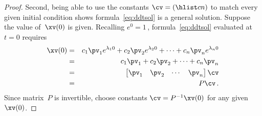 \begin{proof}
\begin{comment}
Straightforward substitution is simpler, but the above reinforces the simplification through diagonalisation.
\end{comment}

Second, being able to use the constants \(\cv=(\hlist cn)\) to match every given initial condition shows formula~\eqref{eq:ddtsol} is a general solution.
Suppose the value of~\(\xv(0)\) is given.
Recalling \(e^0=1\)\,, formula~\eqref{eq:ddtsol} evaluated at \(t=0\)  requires
\begin{eqnarray*}
\xv(0)&=&c_1\pv_1e^{\lambda_10}+c_2\pv_2e^{\lambda_20}+\cdots+c_n\pv_ne^{\lambda_n0}
\\&=&c_1\pv_1+c_2\pv_2+\cdots+c_n\pv_n
\\&=&\begin{bmatrix} \pv_1&\pv_2&\cdots&\pv_n \end{bmatrix}\cv
\\&=&P\cv\,.
\end{eqnarray*}
Since matrix~\(P\) is invertible, choose constants \(\cv=P^{-1}\xv(0)\) for any given~\(\xv(0)\).
\end{proof}





